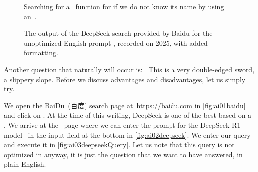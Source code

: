 \begin{noglslink}
\begin{figure}
\floatRowSep%
%
%
%
\floatSep%
%
%
%
\caption{Searching for a \python\ function for  if we do not know its name by using an~.}%
\label{fig:pythondoc:C}%
\end{figure}%
%
\begin{figure}%
\centering%
%
\caption{The output of the DeepSeek search provided by Baidu for the unoptimized English prompt , recorded on 2025, with added formatting.}%
\label{fig:deepseek:output}%
\end{figure}%
%
Another question that naturally will occur is:~
This is a very double-edged sword, a slippery slope.
Before we discuss advantages and disadvantages, let us simply try.

We open the BaiDu~(百度) search page at~\url{https://baidu.com} in \cref{fig:ai01baidu} and click on .
At the time of this writing, DeepSeek is one of the best  based on a .
We arrive at the ~page where we can enter the prompt for the DeepSeek\nobreakdashes-R1 model~\cite{DAGYZSZXZMWBZYWWGSLGLXWWFLZDZRDCJLLDLHCLZBXWDXGQLGLWCYQLCNLCDHGGHYWZZWZXXZZTLWLTHZWCDGZPWCJCLZCYWYZPL2024DRIRCILVRL} in the input field at the bottom in \cref{fig:ai02deepseek}.
We enter our query~ and execute it in \cref{fig:ai03deepseekQuery}.
Let us note that this query is not optimized in anyway, it is just the question that we want to have answered, in plain English.


\end{noglslink}
